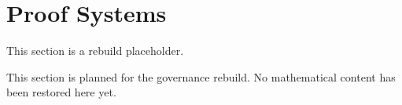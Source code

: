 \section{Proof Systems}

\begin{tcolorbox}[colback=gray!6, colframe=gray!40, arc=2pt,
  left=6pt, right=6pt, top=4pt, bottom=4pt,
  title={\small\textbf{Proof Systems Toolkit - Planned}},
  fonttitle=\small\bfseries]
This section is a rebuild placeholder.
\end{tcolorbox}

This section is planned for the governance rebuild. No mathematical content has
been restored here yet.
